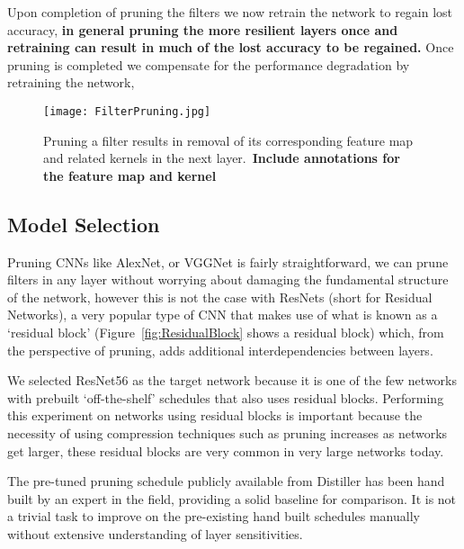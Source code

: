 \documentclass[../Dissertation.tex]{subfiles}
\begin{document}
\noindent Upon completion of pruning the filters we now retrain the network to regain lost accuracy, \textbf{\color{red}in general pruning the more resilient layers once and retraining can result in much of the lost accuracy to be regained.}
Once pruning is completed we compensate for the performance degradation by retraining the network, 

    \begin{figure}[H]
        \centering
        \texttt{[image: FilterPruning.jpg]}
        \caption{Pruning a filter results in removal of its corresponding feature map and related kernels in the next layer.~\autocite{liPruningFiltersEfficient2017}\textbf{\color{red}Include annotations for the feature map and kernel}}
        \label{fig:FeaturemapAndKernel}
    \end{figure}




\subsection{Model Selection}\label{sec:ModelSelection}

Pruning CNNs like AlexNet, or VGGNet is fairly straightforward, we can prune filters in any layer without worrying about damaging the fundamental structure of the network, however this is not the case with ResNets (short for Residual Networks),  a very popular type of CNN that makes use of what is known as a `residual block' (Figure~\ref{fig:ResidualBlock} shows a residual block) which, from the perspective of pruning, adds additional interdependencies between layers.

We selected ResNet56 as the target network because it is one of the few networks with prebuilt `off-the-shelf' schedules that also uses residual blocks. 
Performing this experiment on networks using residual blocks is important because the necessity of using compression techniques such as pruning increases as networks get larger, these residual blocks are very common in very large networks today. 

The pre-tuned pruning schedule publicly available from Distiller has been hand built by an expert in the field, providing a solid baseline for comparison.
It is not a trivial task to improve on the pre-existing hand built schedules manually without extensive understanding of layer sensitivities.  
\end{document}
